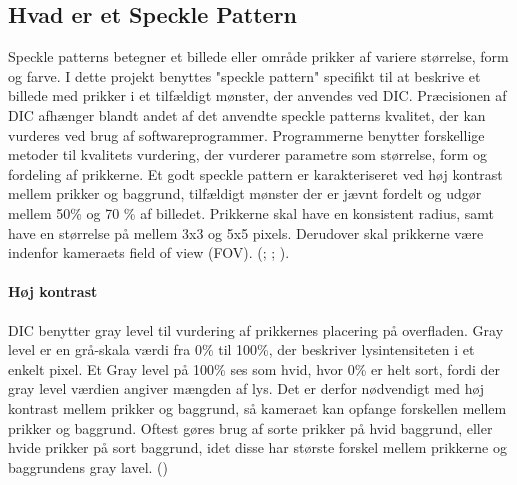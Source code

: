 \subsection{Hvad er et Speckle Pattern} 
Speckle patterns betegner et billede eller område prikker af variere størrelse, form og farve. I dette projekt benyttes "speckle pattern"  specifikt til at beskrive et billede med prikker i et tilfældigt mønster, der anvendes ved DIC. Præcisionen af DIC afhænger blandt andet af det anvendte speckle patterns kvalitet, der kan vurderes ved brug af softwareprogrammer. Programmerne benytter forskellige metoder til kvalitets vurdering, der vurderer parametre som størrelse, form og fordeling af prikkerne. Et godt speckle pattern er karakteriseret ved høj kontrast mellem prikker og baggrund, tilfældigt mønster der er jævnt fordelt og udgør mellem 50\% og 70 \% af billedet. Prikkerne skal have en konsistent radius, samt have en størrelse på mellem 3x3 og 5x5 pixels. Derudover skal prikkerne være indenfor kameraets field of view (FOV). (\cite{Dong2017ACorrelation}; \cite{Su2022Glare:Pattern}; \cite{Gagnon2024ThePatterns}).  


\paragraph{Høj kontrast} DIC benytter gray level til vurdering af prikkernes placering på overfladen. Gray level er en grå-skala værdi fra 0\% til 100\%, der beskriver lysintensiteten i et enkelt pixel. Et Gray level på 100\% ses som hvid, hvor 0\% er helt sort, fordi der gray level værdien angiver mængden af lys. Det er derfor nødvendigt med høj kontrast mellem prikker og baggrund, så kameraet kan opfange forskellen mellem prikker og baggrund. Oftest gøres brug af sorte prikker på hvid baggrund, eller hvide prikker på sort baggrund, idet disse har største forskel mellem prikkerne og baggrundens gray lavel. (\cite{Reu2015AllContrast})


